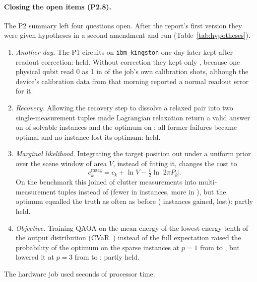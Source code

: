 \documentclass[11pt,a4paper]{article}
\begin{document}
\paragraph{Closing the open items (P2.8).} The P2 summary left four questions open. After the report's first version they were given
hypotheses in a second amendment and run (Table~\ref{tab:hypotheses}).
\begin{enumerate}
\item \emph{Another day.} The P1 circuits on \texttt{ibm\_kingston} one day later kept \PtwoEightHfiveKept{} after readout correction:
      held. Without correction they kept only \PtwoEightHfiveRawKept, because one physical qubit read 0 as 1 in \PtwoEightBadQubit{} of the
      job's own calibration shots, although the device's calibration data from that morning reported a normal readout error for it.
\item \emph{Recovery.} Allowing the recovery step to dissolve a relaxed pair into two single-measurement tuples made Lagrangian
      relaxation return a valid answer on \PtwoEightLRValid{} of solvable instances and the optimum on \PtwoEightLROptimal; all
      \PtwoEightLRFormerFailures{} former failures became optimal and no instance lost its optimum: held.
\item \emph{Marginal likelihood.} Integrating the target position out under a uniform prior over the scene window of area $V$,
      instead of fitting it, changes the cost to
      \begin{equation}
      c_k^{\mathrm{marg}} = c_k + \ln V - \tfrac12\ln\left|2\pi P_k\right| .
      \end{equation}
      On the benchmark this joined \PtwoEightJoinedMarginal{} of \PtwoEightClutterMeasurements{} clutter measurements into
      multi-measurement tuples instead of \PtwoEightJoinedGLR{} (fewer in \PtwoEightJoinedBetter{} instances, more in
      \PtwoEightJoinedWorse), but the optimum equalled the truth as often as before (\PtwoEightTruthGain{} instances gained,
      \PtwoEightTruthLoss{} lost): partly held.
\item \emph{Objective.} Training QAOA on the mean energy of the lowest-energy tenth of the output distribution
      (CVaR~\cite{barkoutsos2020cvar}) instead of the full expectation raised the probability of the optimum on the sparse instances at
      $p=1$ from \PtwoEightExpPone{} to \PtwoEightCvarPone, but lowered it at $p=3$ from \PtwoEightExpPthree{} to \PtwoEightCvarPthree:
      partly held.
\end{enumerate}
The hardware job used \PtwoEightUsage{} seconds of processor time.
\end{document}
